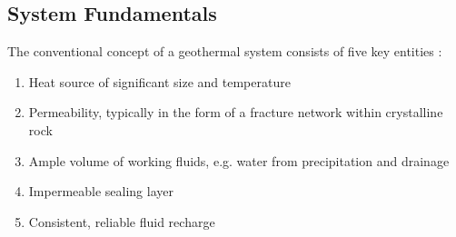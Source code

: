 \subsection{System Fundamentals}\label{ch2:sysfund}
The conventional concept of a geothermal system consists of five key entities \citep[~p. 9]{dipippo_geothermal_2012}:
\renewcommand{\labelenumi}{\roman{enumi}}
\begin{enumerate}\label{list:sysreq}
   \item Heat source of significant size and temperature
   \item Permeability, typically in the form of a fracture network within crystalline rock
   \item Ample volume of working fluids, e.g. water from precipitation and drainage
   \item Impermeable sealing layer
   \item Consistent, reliable fluid recharge
\end{enumerate}

